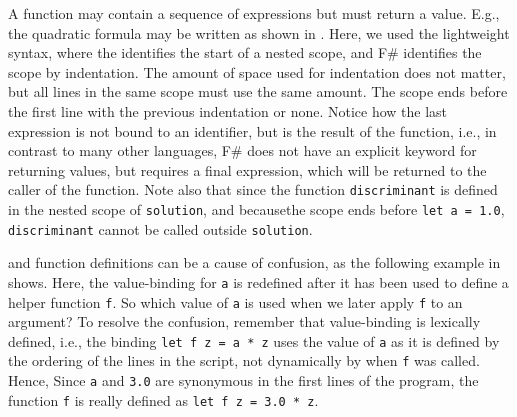 \documentclass[fsharpnotes.tex]{subfiles}
\begin{document}
A function may contain a sequence of expressions but must return a value. E.g., the quadratic formula may be written as shown in . 
%
%
Here, we used the lightweight syntax, where the \lexeme{=} identifies the start of a nested scope, and F\# identifies the scope by indentation. The amount of space used for indentation does not matter, but all lines in the same scope must use the same amount. The scope ends before the first line with the previous indentation or none. Notice how the last expression is not bound to an identifier, but is the result of the function, i.e., in contrast to many other languages, F\# does not have an explicit keyword for returning values, but requires a final expression, which will be returned to the caller of the function. Note also that since the function \lstinline!discriminant! is defined in the nested scope of \lstinline!solution!, and becausethe scope ends before \lstinline!let a = 1.0!, \lstinline!discriminant! cannot be called outside \lstinline!solution!.

 and function definitions can be a cause of confusion, as the following example in  shows.
%
%
Here, the value-binding for \lstinline!a! is redefined after it has been used to define a helper function \lstinline!f!. So which value of \lstinline!a! is used when we later apply \lstinline!f! to an argument? To resolve the confusion, remember that value-binding is lexically defined, i.e., the binding \lstinline!let f z = a * z! uses the value of \lstinline!a! as it is defined by the ordering of the lines in the script, not dynamically by when \lstinline!f! was called. Hence,  Since \lstinline!a! and \lstinline!3.0! are synonymous in the first lines of the program, the function \lstinline!f! is really defined as \lstinline!let f z = 3.0 * z!.
\end{document}
